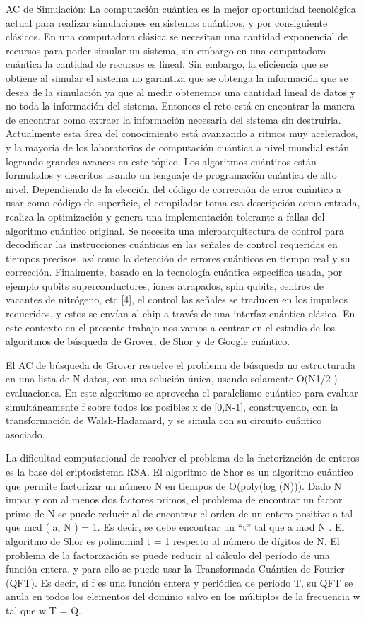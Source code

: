 AC de Simulación: La computación cuántica es la mejor oportunidad tecnológica actual para realizar simulaciones en sistemas cuánticos, y por consiguiente clásicos. En una computadora clásica se necesitan una cantidad exponencial de recursos para poder simular un sistema, sin embargo en una computadora cuántica la cantidad de recursos es lineal. Sin embargo, la eficiencia que se obtiene al simular el sistema no garantiza que se obtenga la información que se desea de la simulación ya que al medir obtenemos una cantidad lineal de datos y no toda la información del sistema. Entonces el reto está en encontrar la manera de encontrar como extraer la información necesaria del sistema sin destruirla. Actualmente esta área del conocimiento está avanzando a ritmos muy acelerados, y la mayoría de los laboratorios de computación cuántica a nivel mundial están logrando grandes avances en este tópico.  Los algoritmos cuánticos están formulados y descritos usando un lenguaje de programación cuántica de alto nivel. Dependiendo de la elección del código de corrección de error cuántico a usar como código de superficie, el compilador toma esa descripción como entrada, realiza la optimización y genera una implementación tolerante a fallas del algoritmo cuántico original. Se necesita una microarquitectura de control para decodificar las instrucciones cuánticas en las señales de control requeridas en tiempos precisos, así como la detección de errores cuánticos en tiempo real y su corrección. Finalmente, basado en la tecnología cuántica específica usada, por ejemplo qubits superconductores, iones atrapados, spin qubits, centros de vacantes de nitrógeno, etc [4], el control las señales se traducen en los impulsos requeridos, y estos se envían al chip a través de una interfaz cuántica-clásica.  En este contexto en el presente trabajo nos vamos a centrar en el estudio de los algoritmos de búsqueda de Grover, de Shor y de Google cuántico.

El AC de búsqueda de Grover resuelve el problema de búsqueda no estructurada en una lista de N datos, con una solución única, usando solamente O(N1/2 ) evaluaciones. En este algoritmo se aprovecha el paralelismo cuántico para evaluar simultáneamente f sobre todos los posibles x de [0,N-1], construyendo, con la transformación de Walsh-Hadamard, y se simula con su circuito cuántico asociado.

La dificultad computacional de resolver el problema de la factorización de enteros es la base del criptosistema RSA. El algoritmo de Shor es un algoritmo cuántico que permite factorizar un número N en tiempos de O(poly(log (N))). Dado N impar y con al menos dos factores primos, el problema de encontrar un factor primo de N se puede reducir al de encontrar el orden de un entero positivo a tal que mcd ( a, N ) = 1. Es decir, se debe encontrar un “t” tal que a mod N . El algoritmo de Shor es polinomial t = 1 respecto al número de dígitos de N. El problema de la factorización se puede reducir al cálculo del período de una función entera, y para ello se puede usar la Transformada Cuántica de Fourier (QFT). Es decir, si f es una función entera y periódica de periodo T, su QFT se anula en todos los elementos del dominio salvo en los múltiplos de la frecuencia w tal que w T = Q.

